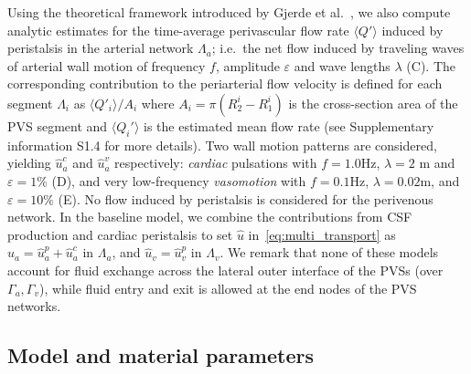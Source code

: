 \documentclass[fleqn,10pt]{wlscirep}
\begin{document}
Using the theoretical framework introduced by Gjerde et
al.~\cite{gjerde2023directional}, we also compute analytic estimates
for the time-average perivascular flow rate $\langle Q' \rangle$
induced by peristalsis in the arterial network $\Lambda_a$; i.e.~the
net flow induced by traveling waves of arterial wall motion of
frequency $f$, amplitude $\varepsilon$ and wave lengths $\lambda$
(C). The corresponding contribution to the
periarterial flow velocity is defined for each segment $\Lambda_i$ as
$\langle Q'_i \rangle/A_i$ where $A_i = \pi (R_2^i - R_1^i)$ is the
cross-section area of the PVS segment and $\langle Q_i' \rangle$ is
the estimated mean flow rate (see Supplementary information S1.4 for
more details). Two wall motion patterns are considered, yielding
$\hat{u}_a^c$ and $\hat{u}_a^v$ respectively: \emph{cardiac}
pulsations with $f = 1.0$Hz, $\lambda = 2$ m and $\varepsilon = 1\%$
(D), and very low-frequency \emph{vasomotion} with $f
= 0.1$Hz, $\lambda = 0.02$m, and $\varepsilon = 10\%$
(E). No flow induced by peristalsis is considered for
the perivenous network. In the baseline model, we combine the
contributions from CSF production and cardiac peristalsis to set
$\hat{u}$ in~\eqref{eq:multi_transport} as $\hat{u}_a = \hat{u}_a^p +
\hat{u}_a^c$ in $\Lambda_a$, and $\hat{u}_v = \hat{u}_v^p$ in
$\Lambda_v$. We remark that none of these models account for fluid
exchange across the lateral outer interface of the PVSs (over
$\Gamma_a, \Gamma_v$), while fluid entry and exit is allowed at the
end nodes of the PVS networks.

\subsection*{Model and material parameters}
\end{document}
